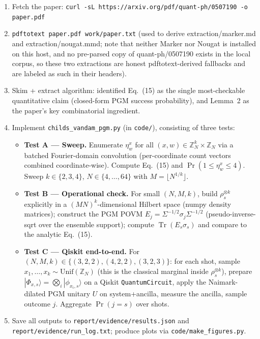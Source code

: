 \documentclass[11pt]{article}
\begin{document}
\begin{enumerate}\itemsep-2pt
  \item Fetch the paper: \verb|curl -sL https://arxiv.org/pdf/quant-ph/0507190 -o paper.pdf|
  \item \verb|pdftotext paper.pdf work/paper.txt| (used to derive extraction/marker.md and extraction/nougat.mmd; note that neither Marker nor Nougat is installed on this host, and no pre-parsed copy of quant-ph/0507190 exists in the local corpus, so these two extractions are honest pdftotext-derived fallbacks and are labeled as such in their headers).
  \item Skim + extract algorithm: identified Eq.~(15) as the single most-checkable quantitative claim (closed-form PGM success probability), and Lemma~2 as the paper's key combinatorial ingredient.
  \item Implement \verb|childs_vandam_pgm.py| (in \verb|code/|), consisting of three tests:
    \begin{itemize}
      \item \textbf{Test A --- Sweep.} Enumerate $\eta_w^x$ for all $(x,w)\in\mathbb{Z}_N^k\times\mathbb{Z}_N$ via a batched Fourier-domain convolution (per-coordinate count vectors combined coordinate-wise). Compute Eq.~(15) and $\Pr(1\le\eta_w^x\le 4)$. Sweep $k\in\{2,3,4\}$, $N\in\{4,\dots,64\}$ with $M=\lfloor N^{1/k}\rfloor$.
      \item \textbf{Test B --- Operational check.} For small $(N,M,k)$, build $\rho_s^{\otimes k}$ explicitly in a $(MN)^k$-dimensional Hilbert space (numpy density matrices); construct the PGM POVM $E_j=\Sigma^{-1/2}\sigma_j\Sigma^{-1/2}$ (pseudo-inverse-sqrt over the ensemble support); compute $\operatorname{Tr}(E_s\sigma_s)$ and compare to the analytic Eq.~(15).
      \item \textbf{Test C --- Qiskit end-to-end.} For $(N,M,k)\in\{(3,2,2),(4,2,2),(3,2,3)\}$: for each shot, sample $x_1,\dots,x_k\sim\mathrm{Unif}(\mathbb{Z}_N)$ (this is the classical marginal inside $\rho_s^{\otimes k}$), prepare $|\Phi_{x,s}\rangle=\bigotimes_i|\phi_{x_i,s}\rangle$ on a Qiskit \verb|QuantumCircuit|, apply the Naimark-dilated PGM unitary $U$ on system+ancilla, measure the ancilla, sample outcome $j$. Aggregate $\Pr(j=s)$ over shots.
    \end{itemize}
  \item Save all outputs to \verb|report/evidence/results.json| and \verb|report/evidence/run_log.txt|; produce plots via \verb|code/make_figures.py|.
\end{enumerate}
\end{document}
